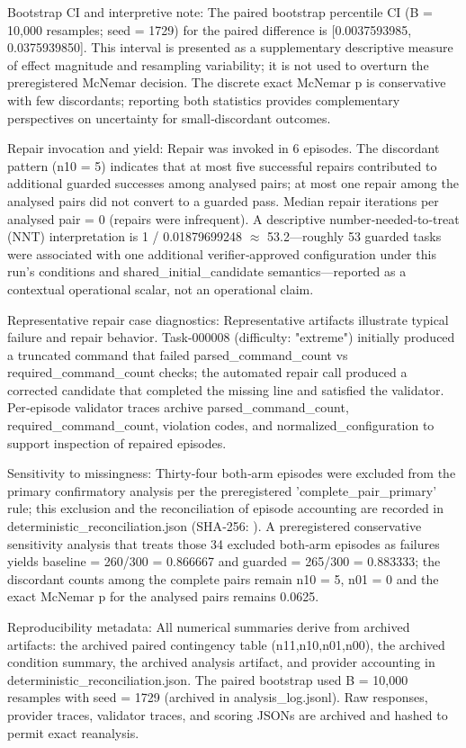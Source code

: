 \documentclass[conference]{IEEEtran}
\begin{document}
Bootstrap CI and interpretive note: The paired bootstrap percentile CI (B = 10,000 resamples; seed = 1729) for the paired difference is [0.0037593985, 0.0375939850]. This interval is presented as a supplementary descriptive measure of effect magnitude and resampling variability; it is not used to overturn the preregistered McNemar decision. The discrete exact McNemar p is conservative with few discordants; reporting both statistics provides complementary perspectives on uncertainty for small‑discordant outcomes.

Repair invocation and yield: Repair was invoked in 6 episodes. The discordant pattern (n10 = 5) indicates that at most five successful repairs contributed to additional guarded successes among analysed pairs; at most one repair among the analysed pairs did not convert to a guarded pass. Median repair iterations per analysed pair = 0 (repairs were infrequent). A descriptive number‑needed‑to‑treat (NNT) interpretation is 1 / 0.01879699248 \ensuremath{\approx} 53.2---roughly 53 guarded tasks were associated with one additional verifier‑approved configuration under this run's conditions and shared\_initial\_candidate semantics---reported as a contextual operational scalar, not an operational claim.

Representative repair case diagnostics: Representative artifacts illustrate typical failure and repair behavior. Task-000008 (difficulty: "extreme") initially produced a truncated command that failed parsed\_command\_count vs required\_command\_count checks; the automated repair call produced a corrected candidate that completed the missing line and satisfied the validator. Per‑episode validator traces archive parsed\_command\_count, required\_command\_count, violation codes, and normalized\_configuration to support inspection of repaired episodes.

Sensitivity to missingness: Thirty‑four both‑arm episodes were excluded from the primary confirmatory analysis per the preregistered 'complete\_pair\_primary' rule; this exclusion and the reconciliation of episode accounting are recorded in deterministic\_reconciliation.json (SHA‑256: ). A preregistered conservative sensitivity analysis that treats those 34 excluded both‑arm episodes as failures yields baseline = 260/300 = 0.866667 and guarded = 265/300 = 0.883333; the discordant counts among the complete pairs remain n10 = 5, n01 = 0 and the exact McNemar p for the analysed pairs remains 0.0625.

Reproducibility metadata: All numerical summaries derive from archived artifacts: the archived paired contingency table (n11,n10,n01,n00), the archived condition summary, the archived analysis artifact, and provider accounting in deterministic\_reconciliation.json. The paired bootstrap used B = 10,000 resamples with seed = 1729 (archived in analysis\_log.jsonl). Raw responses, provider traces, validator traces, and scoring JSONs are archived and hashed to permit exact reanalysis.
\end{document}
